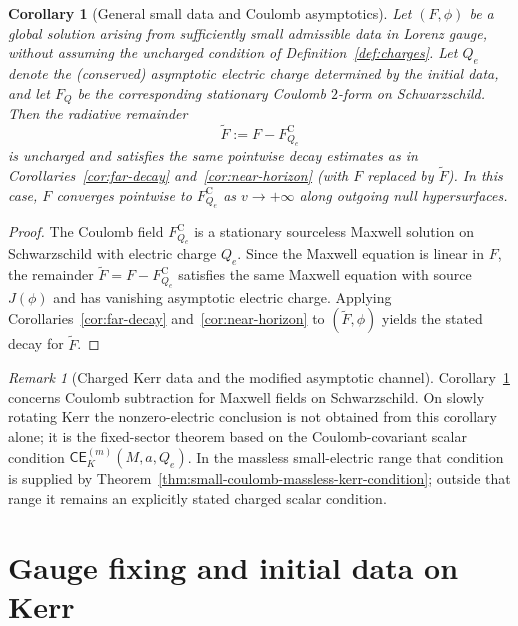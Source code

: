 \documentclass[11pt]{article}
\numberwithin{equation}{section}
\theoremstyle{plain}
\newtheorem{corollary}[theorem]{Corollary}
\theoremstyle{definition}
\theoremstyle{remark}
\newtheorem{remark}{Remark}[section]
\newcommand{\CElec}{\mathsf{CE}}
\begin{document}
\begin{corollary}[General small data and Coulomb asymptotics]\label{cor:Coulomb}
Let $(F,\phi)$ be a global solution arising from sufficiently small admissible data in Lorenz gauge, without assuming the uncharged condition of Definition~\ref{def:charges}.
Let $Q_e$ denote the (conserved) asymptotic electric charge determined by the initial data, and let $F_{Q}$ be the corresponding stationary Coulomb $2$-form on Schwarzschild.
Then the radiative remainder
\begin{equation}
\widetilde F := F - F^{\mathrm C}_{Q_e}
\end{equation}
is uncharged and satisfies the same pointwise decay estimates as in Corollaries~\ref{cor:far-decay} and~\ref{cor:near-horizon} (with $F$ replaced by $\widetilde F$).
In this case, $F$ converges pointwise to $F^{\mathrm C}_{Q_e}$ as $v\to+\infty$ along outgoing null hypersurfaces.
\end{corollary}

\begin{proof}
The Coulomb field $F^{\mathrm C}_{Q_e}$ is a stationary sourceless Maxwell solution on Schwarzschild with electric charge $Q_e$.
Since the Maxwell equation is linear in $F$, the remainder $\widetilde F=F-F^{\mathrm C}_{Q_e}$ satisfies the same Maxwell equation with source $J(\phi)$ and has vanishing asymptotic electric charge.
Applying Corollaries~\ref{cor:far-decay} and~\ref{cor:near-horizon} to $(\widetilde F,\phi)$ yields the stated decay for $\widetilde F$.
\end{proof}

\begin{remark}[Charged Kerr data and the modified asymptotic channel]\label{rem:intro-charged-kerr}
Corollary~\ref{cor:Coulomb} concerns Coulomb subtraction for Maxwell fields on Schwarzschild.  On slowly rotating Kerr the nonzero-electric conclusion is not obtained from this corollary alone; it is the fixed-sector theorem based on the Coulomb-covariant scalar condition \(\CElec^{(m)}_K(M,a,Q_e)\).  In the massless small-electric range that condition is supplied by Theorem~\ref{thm:small-coulomb-massless-kerr-condition}; outside that range it remains an explicitly stated charged scalar condition.
\end{remark}




\section{Gauge fixing and initial data on Kerr}\label{sec:kerr-gauge-data}
\end{document}
